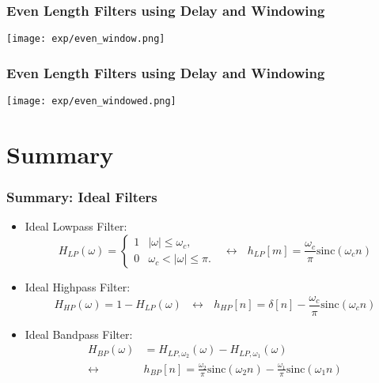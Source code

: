 \documentclass{beamer}
\begin{document}
\begin{frame}
  \frametitle{Even Length Filters using Delay and Windowing}
  \centerline{\texttt{[image: exp/even\_window.png]}}
\end{frame}

\begin{frame}
  \frametitle{Even Length Filters using Delay and Windowing}

  \centerline{\texttt{[image: exp/even\_windowed.png]}}
\end{frame}

\section[Summary]{Summary}
\setcounter{subsection}{1}

\begin{frame}
  \frametitle{Summary: Ideal Filters}
  \begin{itemize}
  \item Ideal Lowpass Filter:
    \[
    H_{LP}(\omega)
    = \begin{cases} 1& |\omega|\le\omega_c,\\
      0 & \omega_c<|\omega|\le\pi.
    \end{cases}~~~\leftrightarrow~~~
    h_{LP}[m]=\frac{\omega_c}{\pi}\mbox{sinc}(\omega_c n)
    \]
  \item Ideal Highpass Filter:
    \[
    H_{HP}(\omega)=1-H_{LP}(\omega)~~~\leftrightarrow~~~
    h_{HP}[n]=\delta[n]-\frac{\omega_c}{\pi}\mbox{sinc}(\omega_c n)
    \]
  \item Ideal Bandpass Filter:
    \begin{align*}
      H_{BP}(\omega)&=H_{LP,\omega_2}(\omega)-H_{LP,\omega_1}(\omega)\\
      \leftrightarrow
      &h_{BP}[n]=\frac{\omega_2}{\pi}\mbox{sinc}(\omega_2 n)-\frac{\omega_1}{\pi}\mbox{sinc}(\omega_1 n)
    \end{align*}
  \end{itemize}
\end{frame}
\end{document}
